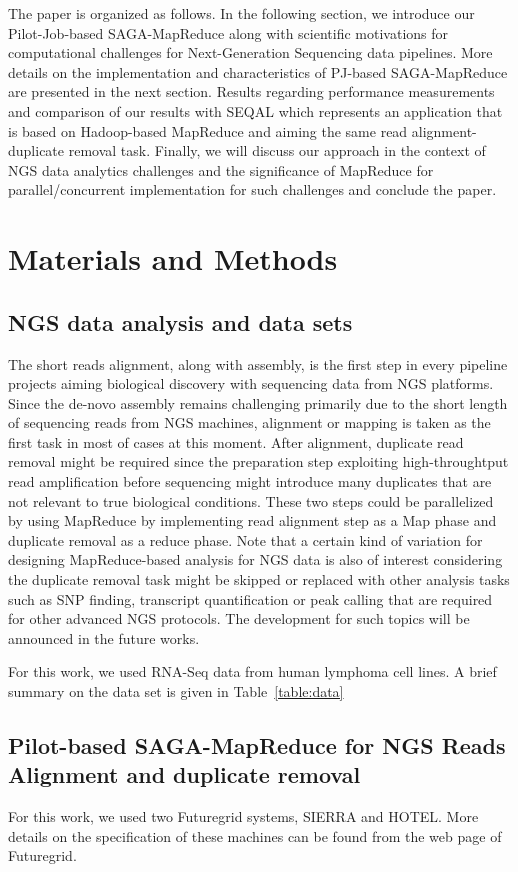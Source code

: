 \documentclass{sig-alternate}
\begin{document}
The paper is organized as follows. In the following section, we introduce our Pilot-Job-based SAGA-MapReduce along with scientific motivations for computational challenges for Next-Generation Sequencing data pipelines.  More details on the implementation and characteristics of PJ-based SAGA-MapReduce are presented in the next section.  Results regarding performance measurements and comparison of our results with SEQAL which represents an application that is based on Hadoop-based MapReduce and aiming the same read alignment-duplicate removal task.  Finally, we will discuss our approach in the context of NGS data analytics challenges and the significance of MapReduce for parallel/concurrent implementation for such challenges and conclude the paper.


\section{Materials and Methods}
\subsection{NGS data analysis and data sets}
The short reads alignment, along with assembly, is the first step in every pipeline projects aiming biological discovery with sequencing data from NGS platforms.  Since the de-novo assembly remains challenging primarily due to the short length of sequencing reads from NGS machines, alignment or mapping is taken as the first task in most of cases at this moment.  After alignment, duplicate read removal might be required since the preparation step exploiting high-throughtput read amplification before sequencing might introduce many duplicates that are not relevant to true biological conditions.  These two steps could be parallelized by using MapReduce by implementing read alignment step as a Map phase and duplicate removal as a reduce phase.  Note that a certain kind of variation for designing MapReduce-based analysis for NGS data is also of interest considering the duplicate removal task might be skipped or replaced with other analysis tasks such as SNP finding, transcript quantification or peak calling that are required for other advanced NGS protocols.  The development for such topics will be announced in the future works.

For this work, we used RNA-Seq data from human lymphoma cell lines.  A brief summary on the data set is given in Table~\ref{table:data}

\subsection{Pilot-based SAGA-MapReduce for NGS Reads Alignment and duplicate removal}
For this work, we used two Futuregrid systems, SIERRA and HOTEL.  More details on the specification of these machines can be found from the web page of Futuregrid\cite{futuregrid_url}.  
\end{document}
